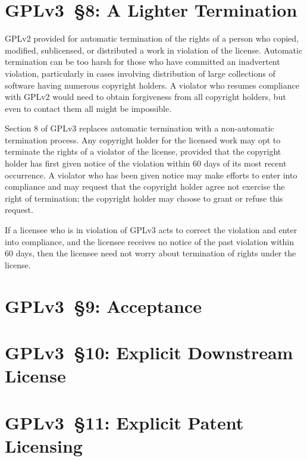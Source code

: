 \section{GPLv3~\S8: A Lighter Termination}


GPLv2 provided for automatic termination of the rights of a person who
copied, modified, sublicensed, or distributed a work in violation of the
license.  Automatic termination can be too harsh for those who have committed
an inadvertent violation, particularly in cases involving distribution of
large collections of software having numerous copyright holders.  A violator
who resumes compliance with GPLv2 would need to obtain forgiveness from all
copyright holders, but even to contact them all might be impossible.


Section 8 of GPLv3 replaces automatic termination with a non-automatic
termination process.  Any copyright holder for the licensed work may opt to
terminate the rights of a violator of the license, provided that the
copyright holder has first given notice of the violation within 60 days of
its most recent occurrence. A violator who has been given notice may make
efforts to enter into compliance and may request that the copyright holder
agree not exercise the right of termination; the copyright holder may choose
to grant or refuse this request.


If a licensee who is in violation of GPLv3 acts to correct the violation and
enter into compliance, and the licensee receives no notice of the past
violation within 60 days, then the licensee need not worry about termination
of rights under the license.

\section{GPLv3~\S9: Acceptance}


\section{GPLv3~\S10: Explicit Downstream License}


\section{GPLv3~\S11: Explicit Patent Licensing}
\label{GPLv3s11}

